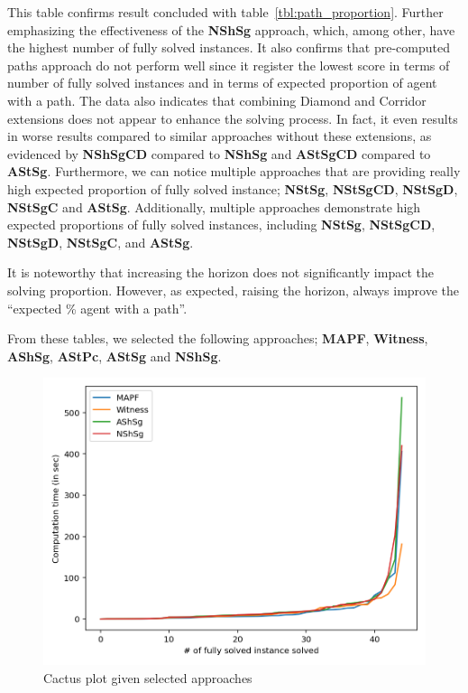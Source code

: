 

This table confirms result concluded with table~\ref{tbl:path_proportion}. Further emphasizing the effectiveness of the \textbf{NShSg} approach, which, among other, have the highest number of fully solved instances.  It also confirms that pre-computed paths approach do not perform well since it register the lowest score in terms of number of fully solved instances and in terms of expected proportion of agent with a path.
The data also indicates that combining Diamond and Corridor extensions does not appear to enhance the solving process. In fact, it even results in worse results compared to similar approaches without these extensions, as evidenced by \textbf{NShSgCD} compared to \textbf{NShSg} and \textbf{AStSgCD} compared to \textbf{AStSg}.
Furthermore, we can notice multiple approaches that are providing really high expected proportion of fully solved instance; \textbf{NStSg}, \textbf{NStSgCD}, \textbf{NStSgD}, \textbf{NStSgC} and \textbf{AStSg}.
Additionally, multiple approaches demonstrate high expected proportions of fully solved instances, including \textbf{NStSg}, \textbf{NStSgCD}, \textbf{NStSgD}, \textbf{NStSgC}, and \textbf{AStSg}.

It is noteworthy that increasing the horizon does not significantly impact the solving proportion. However, as expected, raising the horizon, always improve the ``expected \% agent with a path''.

From these tables, we selected the following approaches; \textbf{MAPF}, \textbf{Witness}, \textbf{AShSg}, \textbf{AStPc}, \textbf{AStSg} and \textbf{NShSg}.

\begin{figure}[H]
    \centering
    \caption{Cactus plot given selected approaches}\label{fig:cactus}
    \includegraphics[width=\widthimg]{img/plt_cactus.png}
\end{figure}


